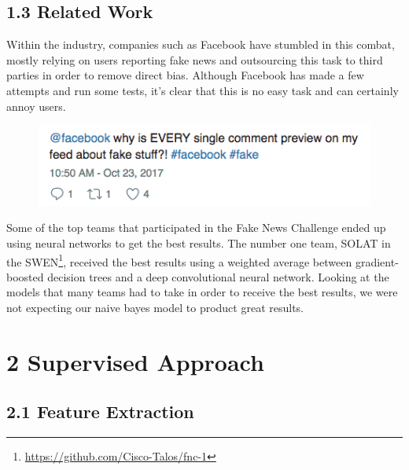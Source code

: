 \documentclass{neu_handout}
\begin{document}
\subsection*{1.3 Related Work}
Within the industry, companies such as Facebook have stumbled in this combat, mostly relying on users reporting fake news and outsourcing this task to third parties in order to remove direct bias. Although Facebook has made a few attempts and run some tests, it's clear that this is no easy task and can certainly annoy users.

\begin{figure}[h]
\centering
{
\includegraphics[width=0.3\linewidth]{fbfake}
}
\end{figure}

Some of the top teams that participated in the Fake News Challenge ended up using neural networks to get the best results. The number one team, SOLAT in the SWEN\footnote{\url{https://github.com/Cisco-Talos/fnc-1}}, received the best results using a weighted average between gradient-boosted decision trees and a deep convolutional neural network. Looking at the models that many teams had to take in order to receive the best results, we were not expecting our naive bayes model to product great results.

\section*{2 Supervised Approach}

\subsection*{2.1 Feature Extraction}
\end{document}
